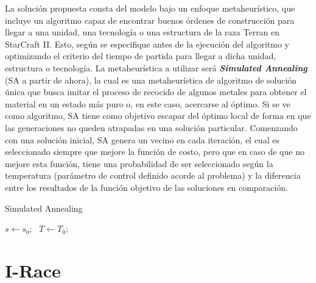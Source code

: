 La solución propuesta consta del modelo bajo un enfoque metaheurístico, que incluye un algoritmo capaz de encontrar buenos órdenes de construcción para llegar a una unidad, una tecnología o una estructura de la raza Terran en StarCraft II. Esto, según se especifique antes de la ejecución del algoritmo y optimizando el criterio del tiempo de partida para llegar a dicha unidad, estructura o tecnología. La metaheurística a utilizar será \textbf{\textit{Simulated Annealing}} (SA a partir de ahora), la cual es una metaheurística de algoritmo de solución única que busca imitar el proceso de recocido de algunos metales para obtener el material en un estado más puro o, en este caso, acercarse al óptimo. Si se ve como algoritmo, SA tiene como objetivo escapar del óptimo local de forma en que las generaciones no queden atrapadas en una solución particular. Comenzando con una solución inicial, SA genera un vecino en cada iteración, el cual es seleccionado siempre que mejore la función de costo, pero que en caso de que no mejore esta función, tiene una probabilidad de ser seleccionado según la temperatura (parámetro de control definido acorde al problema) y la diferencia entre los resultados de la función objetivo de las soluciones en comparación. \newline

\begin{algorithm}[H]

    \caption{Simulated Annealing}\label{alg:sa}
    
    $s \gets s_{0}$; \
    $T \gets T_{0}$; 
    
\end{algorithm}

\section{I-Race}

